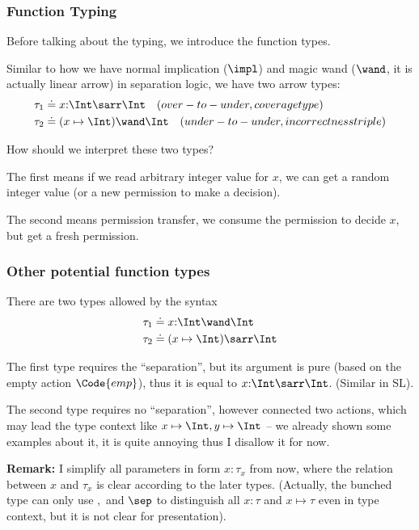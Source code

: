 \begin{frame}[fragile]
    \frametitle{Function Typing}   

Before talking about the typing, we introduce the function types.

Similar to how we have normal implication ($\impl$) and magic wand ($\wand$, it is actually linear arrow) in separation logic, we have two arrow types:
\begin{align*}
    &\tau_1 \doteq x{:}\Int \sarr \Int \quad (over-to-under, coverage type)
    \\&\tau_2 \doteq (x\mapsto\Int) \wand \Int \quad (under-to- under, incorrectness triple)
\end{align*}

How should we interpret these two types? 

The first means if we read arbitrary integer value for $x$, we can get a random integer value (or a new permission to make a decision). 

The second means permission transfer, we consume the permission to decide $x$, but get a fresh permission.

\end{frame}

\begin{frame}[fragile]
    \frametitle{Other potential function types}   

There are two types allowed by the syntax
\begin{align*}
    &\tau_1 \doteq x{:}\Int \wand \Int 
    \\&\tau_2 \doteq (x\mapsto\Int) \sarr \Int 
\end{align*}

The first type requires the ``separation'', but its argument is pure (based on the empty action $\Code{emp}$), thus it is equal to $x{:}\Int \sarr \Int$. (Similar in SL).

The second type requires no ``separation'', however connected two actions, which may lead the type context like $x\mapsto\Int, y\mapsto\Int$ -- we already shown some examples about it, it is quite annoying thus I disallow it for now.

\textbf{Remark:} I simplify all parameters in form $x{:}\tau_x$ from now, where the relation between $x$ and $\tau_x$ is clear according to the later types. (Actually, the bunched type can only use $,$ and $\sep$ to distinguish all $x:\tau$ and $x\mapsto\tau$ even in type context, but it is not clear for presentation).

\end{frame}


